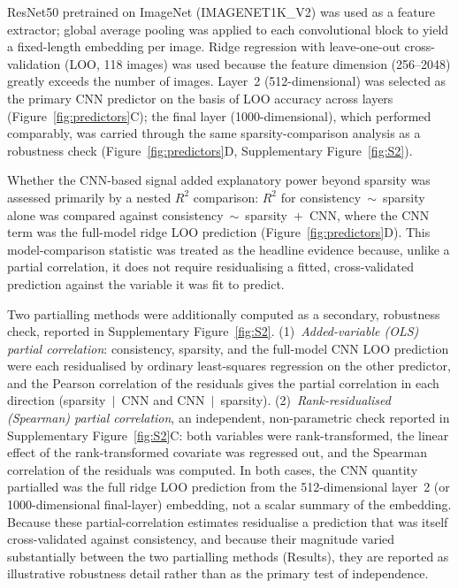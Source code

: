\documentclass[11pt,onecolumn]{article}
\begin{document}
ResNet50 pretrained on ImageNet (IMAGENET1K\_V2) was used as a feature
extractor; global average pooling was applied to each convolutional block
to yield a fixed-length embedding per image.  Ridge regression with
leave-one-out cross-validation (LOO, 118 images) was used because the
feature dimension (256--2048) greatly exceeds the number of images.
Layer~2 (512-dimensional) was selected as the primary CNN predictor on
the basis of LOO accuracy across layers (Figure~\ref{fig:predictors}C);
the final layer (1000-dimensional), which performed comparably, was
carried through the same sparsity-comparison analysis as a
robustness check (Figure~\ref{fig:predictors}D, Supplementary
Figure~\ref{fig:S2}).

Whether the CNN-based signal added explanatory power beyond sparsity
was assessed primarily by a nested $R^2$ comparison: $R^2$ for
consistency~$\sim$~sparsity alone was compared against
consistency~$\sim$~sparsity~$+$~CNN, where the CNN term was the
full-model ridge LOO prediction (Figure~\ref{fig:predictors}D). This
model-comparison statistic was treated as the headline evidence because,
unlike a partial correlation, it does not require residualising a
fitted, cross-validated prediction against the variable it was fit to
predict.

Two partialling methods were additionally computed as a secondary,
robustness check, reported in Supplementary Figure~\ref{fig:S2}.
(1)~\textit{Added-variable (OLS) partial correlation}: consistency,
sparsity, and the full-model CNN LOO prediction were each residualised
by ordinary least-squares regression on the other predictor, and the
Pearson correlation of the residuals gives the partial correlation in
each direction (sparsity~$|$~CNN and CNN~$|$~sparsity).
(2)~\textit{Rank-residualised (Spearman) partial correlation}, an
independent, non-parametric check reported in Supplementary
Figure~\ref{fig:S2}C: both variables were rank-transformed, the linear
effect of the rank-transformed covariate was regressed out, and the
Spearman correlation of the residuals was computed.  In both cases, the
CNN quantity partialled was the full ridge LOO prediction from the
512-dimensional layer~2 (or 1000-dimensional final-layer) embedding, not
a scalar summary of the embedding.  Because these partial-correlation
estimates residualise a prediction that was itself cross-validated
against consistency, and because their magnitude varied substantially
between the two partialling methods (Results), they are reported as
illustrative robustness detail rather than as the primary test of
independence.
\end{document}
